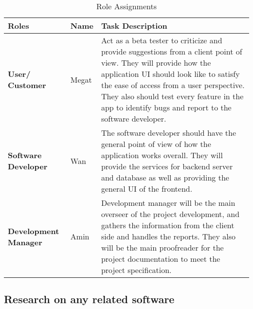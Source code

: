 \documentclass[conference]{IEEEtran}
\begin{document}
\begin{table}[htbp]
\caption{Role Assignments}
\begin{center}
\begin{tabular}{ | m{5em} | m{2cm}| m{3cm} | } 
  \hline
 \textbf{Roles}& \textbf{Name} & \textbf{Task Description} \\
\hline
  \textbf{User/ Customer} & Megat & Act as a beta tester to criticize and provide suggestions from a client point of view. They will provide how the application UI should look like to satisfy the ease of access from a user perspective. They also should test every feature in the app to identify bugs and report to the software developer. \\
  \hline
  \textbf{Software Developer} & Wan & The software developer should have the general point of view of how the application works overall. They will provide the services for backend server and database as well as providing the general UI of the frontend.   \\ 
  \hline
  \textbf{Development Manager} & Amin & Development manager will be the main overseer of the project development, and gathers the information from the client side and handles the reports. They also will be the main proofreader for the project documentation to meet the project specification.	\\
  \hline
\end{tabular}
\end{center}
\end{table}

\subsection{Research on any related software }
\end{document}
